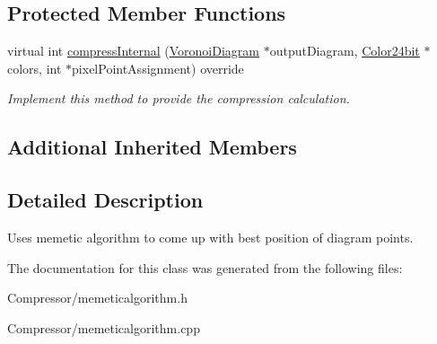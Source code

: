 \subsection*{Protected Member Functions}
\begin{DoxyCompactItemize}
\item 
virtual int \hyperlink{classlossycompressor_1_1_memetic_algorithm_a04b6e6ac9468808694b006f283d1e6d9}{compress\+Internal} (\hyperlink{structlossycompressor_1_1_voronoi_diagram}{Voronoi\+Diagram} $\ast$output\+Diagram, \hyperlink{structlossycompressor_1_1_color24bit}{Color24bit} $\ast$colors, int $\ast$pixel\+Point\+Assignment) override\hypertarget{classlossycompressor_1_1_memetic_algorithm_a04b6e6ac9468808694b006f283d1e6d9}{}\label{classlossycompressor_1_1_memetic_algorithm_a04b6e6ac9468808694b006f283d1e6d9}

\begin{DoxyCompactList}\small\item\em Implement this method to provide the compression calculation. \end{DoxyCompactList}\end{DoxyCompactItemize}
\subsection*{Additional Inherited Members}


\subsection{Detailed Description}
Uses memetic algorithm to come up with best position of diagram points. 

The documentation for this class was generated from the following files\+:\begin{DoxyCompactItemize}
\item 
Compressor/memeticalgorithm.\+h\item 
Compressor/memeticalgorithm.\+cpp\end{DoxyCompactItemize}
